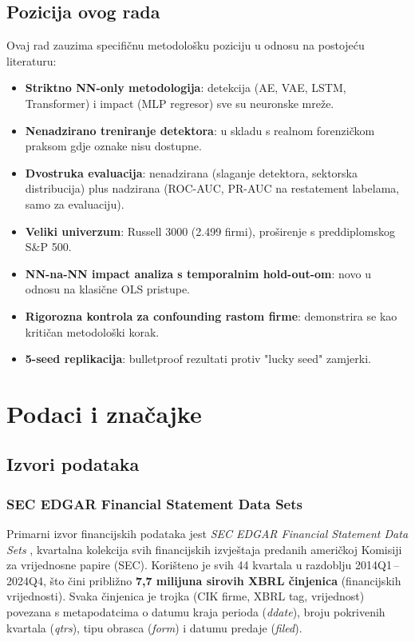 \documentclass[diplomskirad,authoryear]{fer}
\begin{document}
\section{Pozicija ovog rada}

Ovaj rad zauzima specifičnu metodološku poziciju u odnosu na postojeću literaturu:
\begin{itemize}
 \item \textbf{Striktno NN-only metodologija}: detekcija (AE, VAE, LSTM, Transformer) i impact (MLP regresor) sve su neuronske mreže.
 \item \textbf{Nenadzirano treniranje detektora}: u skladu s realnom forenzičkom praksom gdje oznake nisu dostupne.
 \item \textbf{Dvostruka evaluacija}: nenadzirana (slaganje detektora, sektorska distribucija) plus nadzirana (ROC-AUC, PR-AUC na restatement labelama, samo za evaluaciju).
 \item \textbf{Veliki univerzum}: Russell 3000 (2.499 firmi), proširenje s preddiplomskog S\&P 500.
 \item \textbf{NN-na-NN impact analiza s temporalnim hold-out-om}: novo u odnosu na klasične OLS pristupe.
 \item \textbf{Rigorozna kontrola za confounding rastom firme}: demonstrira se kao kritičan metodološki korak.
 \item \textbf{5-seed replikacija}: bulletproof rezultati protiv "lucky seed" zamjerki.
\end{itemize}

\chapter{Podaci i značajke}

\section{Izvori podataka}

\subsection{SEC EDGAR Financial Statement Data Sets}
Primarni izvor financijskih podataka jest \emph{SEC EDGAR Financial Statement Data Sets} \citep{secedgar2024}, kvartalna kolekcija svih financijskih izvještaja predanih američkoj Komisiji za vrijednosne papire (SEC). Korišteno je svih 44 kvartala u razdoblju 2014Q1\,--\,2024Q4, što čini približno \textbf{7{,}7 milijuna sirovih XBRL činjenica} (financijskih vrijednosti). Svaka činjenica je trojka (CIK firme, XBRL tag, vrijednost) povezana s metapodatcima o datumu kraja perioda (\emph{ddate}), broju pokrivenih kvartala (\emph{qtrs}), tipu obrasca (\emph{form}) i datumu predaje (\emph{filed}).
\end{document}
